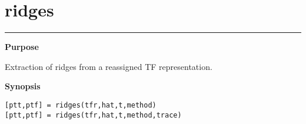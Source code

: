 


\section*{\hspace*{-1.6cm} ridges}

\vspace*{-.4cm}
\hspace*{-1.6cm}\rule[0in]{16.5cm}{.02cm}
\vspace*{.2cm}



{\bf \large \sf Purpose}\\
\hspace*{1.5cm}
\begin{minipage}[t]{13.5cm}
Extraction of ridges from a reassigned TF representation.
\end{minipage}
\vspace*{.5cm}


{\bf \large \sf Synopsis}\\
\hspace*{1.5cm}
\begin{minipage}[t]{13.5cm}
\begin{verbatim}
[ptt,ptf] = ridges(tfr,hat,t,method)
[ptt,ptf] = ridges(tfr,hat,t,method,trace)
\end{verbatim}
\end{minipage}
\vspace*{.5cm}


